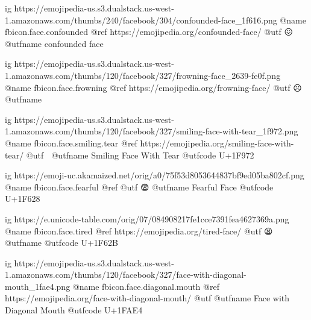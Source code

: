 	ig https://emojipedia-us.s3.dualstack.us-west-1.amazonaws.com/thumbs/240/facebook/304/confounded-face_1f616.png
	@name fbicon.face.confounded
	@ref https://emojipedia.org/confounded-face/
	@utf 😖
	@utfname confounded face

	ig https://emojipedia-us.s3.dualstack.us-west-1.amazonaws.com/thumbs/120/facebook/327/frowning-face_2639-fe0f.png
	@name fbicon.face.frowning
	@ref https://emojipedia.org/frowning-face/
	@utf ☹️
	@utfname

	ig https://emojipedia-us.s3.dualstack.us-west-1.amazonaws.com/thumbs/120/facebook/327/smiling-face-with-tear_1f972.png
	@name fbicon.face.smiling.tear
	@ref https://emojipedia.org/smiling-face-with-tear/
	@utf 🥲
	@utfname Smiling Face With Tear
	@utfcode U+1F972

	ig https://emoji-uc.akamaized.net/orig/a0/75f53d8053644837bf9ed05ba802cf.png
	@name fbicon.face.fearful
	@ref
	@utf 😨
	@utfname Fearful Face
	@utfcode U+1F628

	ig https://e.unicode-table.com/orig/07/084908217fe1cce7391fea4627369a.png
	@name fbicon.face.tired
	@ref https://emojipedia.org/tired-face/
	@utf 😫
	@utfname
	@utfcode U+1F62B

	ig https://emojipedia-us.s3.dualstack.us-west-1.amazonaws.com/thumbs/120/facebook/327/face-with-diagonal-mouth_1fae4.png
	@name fbicon.face.diagonal.mouth
	@ref https://emojipedia.org/face-with-diagonal-mouth/
	@utf
	@utfname Face with Diagonal Mouth
	@utfcode U+1FAE4

\fi
